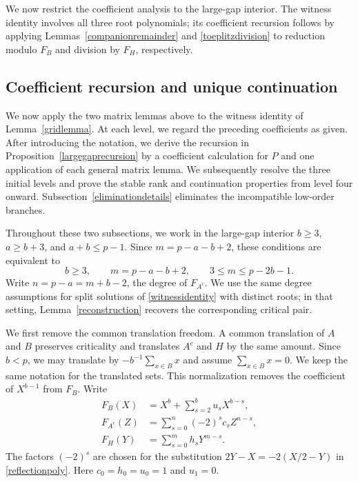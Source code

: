\documentclass[12pt]{article}
\theoremstyle{remark}
\begin{document}
We now restrict the coefficient analysis to the large-gap interior.
The witness identity involves all three root polynomials; its coefficient
recursion follows by applying Lemmas~\ref{companionremainder} and
\ref{toeplitzdivision} to reduction modulo $F_B$ and division by $F_H$,
respectively.

\subsection{Coefficient recursion and unique continuation}
\label{recurrence}

We now apply the two matrix lemmas above to the witness identity of
Lemma~\ref{gridlemma}.  At each level, we regard the preceding coefficients as given.
After introducing the notation, we derive the recursion in
Proposition~\ref{largegaprecursion} by a coefficient calculation for $P$
and one application of each general matrix lemma.  We subsequently resolve
the three initial levels and prove the stable rank and continuation
properties from level four onward.  Subsection~\ref{eliminationdetails}
eliminates the incompatible low-order branches.

Throughout these two subsections, we work in the large-gap interior
$b\ge3$, $a\ge b+3$, and $a+b\le p-1$.  Since $m=p-a-b+2$, these
conditions are equivalent to
\begin{equation}\label{rangealllarge}
 b\ge3,\qquad m=p-a-b+2,\qquad
 3\le m\le p-2b-1.
\end{equation}
Write $n=p-a=m+b-2$, the degree of $F_{A^c}$.
We use the same degree assumptions for split solutions of
\eqref{witnessidentity} with distinct roots; in that setting,
Lemma~\ref{reconstruction} recovers the corresponding critical pair.

We first remove the common translation freedom.  A common
translation of $A$ and $B$ preserves criticality and translates
$A^c$ and $H$ by the same amount.  Since $b<p$, we may translate by
$-b^{-1}\sum_{x\in B}x$ and assume $\sum_{x\in B}x=0$.  We keep the
same notation for the translated sets.
This normalization removes the coefficient of $X^{b-1}$ from $F_B$.
Write
\begin{equation}\label{rootpolys}
\begin{aligned}
 F_B(X)&=X^b+\sum_{s=2}^{b}u_sX^{b-s},\\
 F_{A^c}(Z)&=\sum_{s=0}^{n}(-2)^sc_sZ^{n-s},\\
 F_H(Y)&=\sum_{s=0}^{m}h_sY^{m-s}.
\end{aligned}
\end{equation}
The factors $(-2)^s$ are chosen for the substitution
$2Y-X=-2(X/2-Y)$ in \eqref{reflectionpoly}.
Here $c_0=h_0=u_0=1$ and $u_1=0$.
\end{document}
